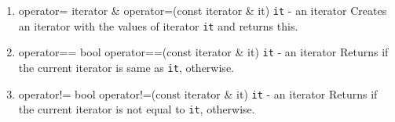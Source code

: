 \begin{enumerate}
\begin{detail}
{operator-$>$}
{node * operator-$>$()}
{--}
{Returns the current iterator.} 
\end{detail}
\item \begin{detail}
{operator=}
{iterator \& operator=(const iterator \& it)}
{\texttt{it} - an iterator}
{Creates an iterator with the values of iterator \texttt{it} and returns this. } 
\end{detail}
\item \begin{detail}
{operator==}
{bool operator==(const iterator \& it)}
{\texttt{it} - an iterator}
{Returns \true if the current iterator is same as \texttt{it}, \false otherwise.} 
\end{detail}
\item \begin{detail}
{operator!=}
{bool operator!=(const iterator \& it)}
{\texttt{it} - an iterator}
{Returns \true if the current iterator is not equal to \texttt{it}, \false otherwise.} 
\end{detail}
\end{enumerate}




